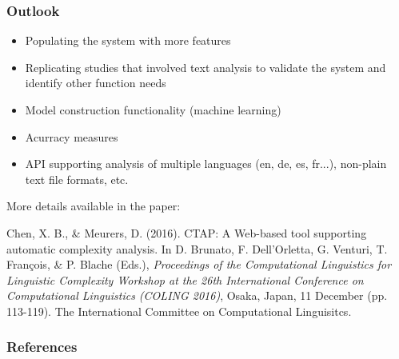 \documentclass{beamer}
\begin{document}
	\begin{frame}
		\frametitle{Outlook}

		\begin{itemize}
			\item Populating the system with more features
			\item Replicating studies that involved text analysis to validate the
			system and identify other function needs 
			\item Model construction functionality (machine learning)
			\item Acurracy measures
			\item API supporting analysis of multiple languages (en, de, es,
				 fr...), non-plain text file formats, etc. 
		\end{itemize}

		More details available in the paper:

		\scriptsize{
			 Chen, X. B., \& Meurers, D. (2016). CTAP: A Web-based tool supporting
			 automatic complexity analysis. In D. Brunato, F. Dell'Orletta, G.
			 Venturi, T. François, \& P. Blache (Eds.), \textit{Proceedings of the
			 Computational Linguistics for Linguistic Complexity Workshop at the
			 26th International Conference on Computational Linguistics (COLING
		2016)}, Osaka, Japan, 11 December (pp. 113-119). The International
		Committee on Computational Linguisitcs.
		}

	\end{frame}

	\begin{frame}
		\frametitle{References}
		\tiny
		

	\end{frame}
	
\end{document}
